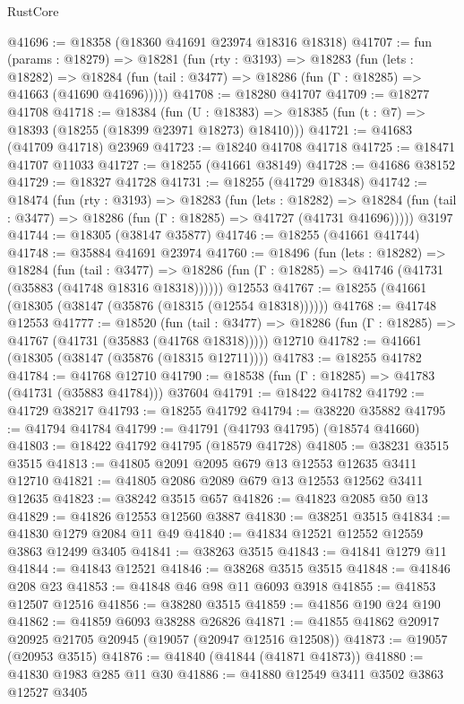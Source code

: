 \begin{lexlean}{RustCore}
\begin{coremodule}
@41696 := @18358 (@18360 @41691 @23974 @18316 @18318)
@41707 := fun (params : @18279) =>
  @18281
    (fun (rty : @3193) =>
    @18283
      (fun (lets : @18282) =>
      @18284 (fun (tail : @3477) => @18286 (fun (Γ : @18285) => @41663 (@41690 @41696)))))
@41708 := @18280 @41707
@41709 := @18277 @41708
@41718 := @18384
    (fun (U : @18383) => @18385 (fun (t : @7) => @18393 (@18255 (@18399 @23971 @18273) @18410)))
@41721 := @41683 (@41709 @41718) @23969
@41723 := @18240 @41708 @41718
@41725 := @18471 @41707 @11033
@41727 := @18255 (@41661 @38149)
@41728 := @41686 @38152
@41729 := @18327 @41728
@41731 := @18255 (@41729 @18348)
@41742 := @18474
    (fun (rty : @3193) =>
    @18283
      (fun (lets : @18282) =>
      @18284 (fun (tail : @3477) => @18286 (fun (Γ : @18285) => @41727 (@41731 @41696)))))
    @3197
@41744 := @18305 (@38147 @35877)
@41746 := @18255 (@41661 @41744)
@41748 := @35884 @41691 @23974
@41760 := @18496
    (fun (lets : @18282) =>
    @18284
      (fun (tail : @3477) =>
      @18286 (fun (Γ : @18285) => @41746 (@41731 (@35883 (@41748 @18316 @18318))))))
    @12553
@41767 := @18255 (@41661 (@18305 (@38147 (@35876 (@18315 (@12554 @18318))))))
@41768 := @41748 @12553
@41777 := @18520
    (fun (tail : @3477) => @18286 (fun (Γ : @18285) => @41767 (@41731 (@35883 (@41768 @18318)))))
    @12710
@41782 := @41661 (@18305 (@38147 (@35876 (@18315 @12711))))
@41783 := @18255 @41782
@41784 := @41768 @12710
@41790 := @18538 (fun (Γ : @18285) => @41783 (@41731 (@35883 @41784))) @37604
@41791 := @18422 @41782
@41792 := @41729 @38217
@41793 := @18255 @41792
@41794 := @38220 @35882
@41795 := @41794 @41784
@41799 := @41791 (@41793 @41795) (@18574 @41660)
@41803 := @18422 @41792 @41795 (@18579 @41728)
@41805 := @38231 @3515 @3515
@41813 := @41805 @2091 @2095 @679 @13 @12553 @12635 @3411 @12710
@41821 := @41805 @2086 @2089 @679 @13 @12553 @12562 @3411 @12635
@41823 := @38242 @3515 @657
@41826 := @41823 @2085 @50 @13
@41829 := @41826 @12553 @12560 @3887
@41830 := @38251 @3515
@41834 := @41830 @1279 @2084 @11 @49
@41840 := @41834 @12521 @12552 @12559 @3863 @12499 @3405
@41841 := @38263 @3515
@41843 := @41841 @1279 @11
@41844 := @41843 @12521
@41846 := @38268 @3515 @3515
@41848 := @41846 @208 @23
@41853 := @41848 @46 @98 @11 @6093 @3918
@41855 := @41853 @12507 @12516
@41856 := @38280 @3515
@41859 := @41856 @190 @24 @190
@41862 := @41859 @6093 @38288 @26826
@41871 := @41855 @41862 @20917 @20925 @21705 @20945 (@19057 (@20947 @12516 @12508))
@41873 := @19057 (@20953 @3515)
@41876 := @41840 (@41844 (@41871 @41873))
@41880 := @41830 @1983 @285 @11 @30
@41886 := @41880 @12549 @3411 @3502 @3863 @12527 @3405

\end{coremodule}
\end{lexlean}
